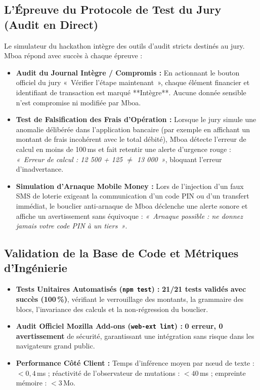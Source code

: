 \documentclass[10pt,a4paper]{article}
\begin{document}
\newpage

\subsection{L'Épreuve du Protocole de Test du Jury (Audit en Direct)}
Le simulateur du hackathon intègre des outils d'audit stricts destinés au jury. Mboa répond avec succès à chaque épreuve :
\begin{itemize}
  \item \textbf{Audit du Journal Intègre / Compromis :} En actionnant le bouton officiel du jury «~Vérifier l'étape maintenant~», chaque élément financier et identifiant de transaction est marqué **Intègre**. Aucune donnée sensible n'est compromise ni modifiée par Mboa.
  \item \textbf{Test de Falsification des Frais d'Opération :} Lorsque le jury simule une anomalie délibérée dans l'application bancaire (par exemple en affichant un montant de frais incohérent avec le total débité), Mboa détecte l'erreur de calcul en moins de 100\,ms et fait retentir une alerte d'urgence rouge : \textit{«~Erreur de calcul : 12 500 + 125 $\neq$ 13 000~»}, bloquant l'erreur d'inadvertance.
  \item \textbf{Simulation d'Arnaque Mobile Money :} Lors de l'injection d'un faux SMS de loterie exigeant la communication d'un code PIN ou d'un transfert immédiat, le bouclier anti-arnaque de Mboa déclenche une alerte sonore et affiche un avertissement sans équivoque : \textit{«~Arnaque possible : ne donnez jamais votre code PIN à un tiers~»}.
\end{itemize}

\subsection{Validation de la Base de Code et Métriques d'Ingénierie}
\begin{itemize}
  \item \textbf{Tests Unitaires Automatisés (\texttt{npm test}) :} \textbf{21/21 tests validés avec succès (100\,\%)}, vérifiant le verrouillage des montants, la grammaire des blocs, l'invariance des calculs et la non-régression du bouclier.
  \item \textbf{Audit Officiel Mozilla Add-ons (\texttt{web-ext lint}) :} \textbf{0 erreur, 0 avertissement} de sécurité, garantissant une intégration sans risque dans les navigateurs grand public.
  \item \textbf{Performance Côté Client :} Temps d'inférence moyen par nœud de texte : $< 0{,}4$\,ms ; réactivité de l'observateur de mutations : $< 40$\,ms ; empreinte mémoire : $< 3$\,Mo.
\end{itemize}
\end{document}
